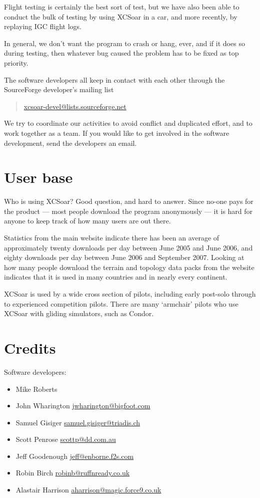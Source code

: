 \documentclass[a4paper,12pt]{refrep}
\begin{document}
Flight testing is certainly the best sort of test, but we have also
been able to conduct the bulk of testing by using XCSoar in a car,
and more recently, by replaying IGC flight logs.

In general, we don't want the program to crash or hang, ever, and if
it does so during testing, then whatever bug caused the problem has to
be fixed as top priority.

The software developers all keep in contact with each other through
the SourceForge developer's mailing list
\begin{quote}
\url{xcsoar-devel@lists.sourceforge.net}
\end{quote}
We try to coordinate our activities to avoid conflict and duplicated
effort, and to work together as a team.  If you would like to get
involved in the software development, send the developers an email.

\section{User base}

Who is using XCSoar?  Good question, and hard to answer.  Since no-one
pays for the product --- most people download the program anonymously
--- it is hard for anyone to keep track of how many users are out
there.

Statistics from the main website indicate there has been an average of
approximately twenty downloads per day between June 2005 and June
2006, and eighty downloads per day between June 2006 and September
2007.  Looking at how many people download the terrain and topology
data packs from the website indicates that it is used in many
countries and in nearly every continent.

XCSoar is used by a wide cross section of pilots, including early
post-solo through to experienced competition pilots.  There are many
`armchair' pilots who use XCSoar with gliding simulators, such as
Condor.

\section{Credits}

Software developers:
\begin{itemize}
\item Mike Roberts 
\item John Wharington \url{jwharington@bigfoot.com}
\item Samuel Gisiger \url{samuel.gisiger@triadis.ch}
\item Scott Penrose \url{scottp@dd.com.au}
\item Jeff Goodenough \url{jeff@enborne.f2s.com}
\item Robin Birch \url{robinb@ruffnready.co.uk}
\item Alastair Harrison \url{aharrison@magic.force9.co.uk}
\end{itemize}
\end{document}

